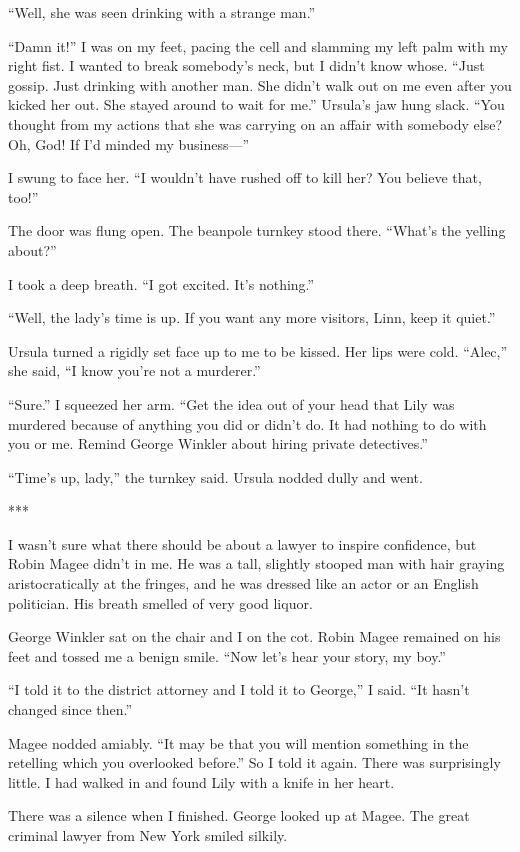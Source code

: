 \documentclass{novel}
\begin{document}
“Well, she was seen drinking with a strange man.”

“Damn it!” I was on my feet, pacing the cell and slamming my left palm with my right fist. I wanted to break somebody’s neck, but I didn’t know whose. “Just gossip. Just drinking with another man. She didn’t walk out on me even after you kicked her out. She stayed around to wait for me.” Ursula’s jaw hung slack. “You thought from my actions that she was carrying on an affair with somebody else? Oh, God! If I’d minded my business—”

I swung to face her. “I wouldn’t have rushed off to kill her? You believe that, too!”

The door was flung open. The beanpole turnkey stood there. “What’s the yelling about?”

I took a deep breath. “I got excited. It’s nothing.”

“Well, the lady’s time is up. If you want any more visitors, Linn, keep it quiet.”

Ursula turned a rigidly set face up to me to be kissed. Her lips were cold. “Alec,” she said, “I know you’re not a murderer.”

“Sure.” I squeezed her arm. “Get the idea out of your head that Lily was murdered because of anything you did or didn’t do. It had nothing to do with you or me. Remind George Winkler about hiring private detectives.”

“Time’s up, lady,” the turnkey said. Ursula nodded dully and went.

***

I wasn’t sure what there should be about a lawyer to inspire confidence, but Robin Magee didn’t in me. He was a tall, slightly stooped man with hair graying aristocratically at the fringes, and he was dressed like an actor or an English politician. His breath smelled of very good liquor.

George Winkler sat on the chair and I on the cot. Robin Magee remained on his feet and tossed me a benign smile. “Now let’s hear your story, my boy.”

“I told it to the district attorney and I told it to George,” I said. “It hasn’t changed since then.”

Magee nodded amiably. “It may be that you will mention something in the retelling which you overlooked before.” So I told it again. There was surprisingly little. I had walked in and found Lily with a knife in her heart.

There was a silence when I finished. George looked up at Magee. The great criminal lawyer from New York smiled silkily.
\end{document}
